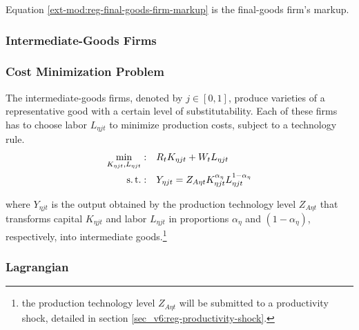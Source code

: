\documentclass[../thesis.tex]{subfiles}
\begin{document}
Equation \ref{ext-mod:reg-final-goods-firm-markup} is the final-goods firm's markup.


\subsubsection{Intermediate-Goods Firms}

\subsubsection*{Cost Minimization Problem}

The intermediate-goods firms, denoted by $j \in [0,1]$, produce varieties of a representative good with a certain level of substitutability. Each of these firms has to choose labor $L_{\eta jt}$ to minimize production costs, subject to a technology rule.
\begin{align}
	\label{ext-mod:reg-int-good-firm-total-cost}
	\min_{K_{\eta jt}, L_{\eta jt}}: \quad & R_{t} K_{\eta jt} + W_t L_{\eta jt} \\
	\label{ext-mod:reg-int-good-firm-prod-function}
	\operatorname{s.t.}: \quad & Y_{\eta jt} = Z_{A\eta t} K_{\eta jt}^{\alpha_{\eta}} L_{\eta jt}^{1-{\alpha_{\eta}}}
\end{align}

\begin{comment}
	
	\begin{tcolorbox}[colback=red!5!white,colframe=red!75!black]
		“We set this parameter so that profits are zero in steady state” [Adolfson et al., 2014, p. 36] 
	\end{tcolorbox}	

\end{comment}

where $Y_{\eta jt}$ is the output obtained by the production technology level $Z_{A\eta t}$ that transforms capital $K_{\eta jt}$ and labor $L_{\eta jt}$ in proportions ${\alpha_{\eta}}$ and $(1-{\alpha_{\eta}})$, respectively, into intermediate goods.\footnote{the production technology level $Z_{A\eta t}$ will be submitted to a productivity shock, detailed in section \ref{sec_v6:reg-productivity-shock}.}

\subsubsection*{Lagrangian}
\end{document}
